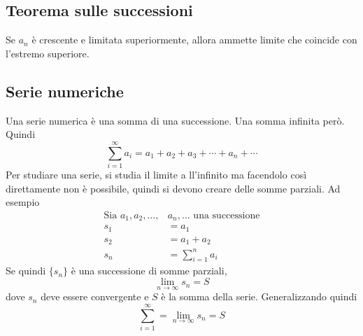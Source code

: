 \subsection{Teorema sulle successioni}
\begin{successioniMonotone}
  Se $a_n$ è crescente e limitata superiormente, allora ammette limite che coincide con l'estremo
  superiore.
\end{successioniMonotone}

\subsection{Serie numeriche}
Una serie numerica è una somma di una successione. Una somma infinita però. Quindi
\begin{equation*}
  \sum\limits^{\infty}_{i=1} a_i = a_1+a_2+a_3+\dotsb+a_n+\dotsb
\end{equation*}
Per studiare una serie, si studia il limite a ll'infinito ma facendolo così direttamente non è
possibile, quindi si devono creare delle somme parziali. Ad esempio
\begin{align*}
  \text{Sia }a_1,a_2,\ldots,&a_n,\ldots\text{ una successione}\\
  s_1 &= a_1\\
  s_2 &= a_1+a_2\\
  s_n &= \sum\limits^{n}_{i=1} a_i
\end{align*}
Se quindi $\{s_n\}$ è una successione di somme parziali,
\begin{equation*}
  \lim\limits_{n \to \infty} s_n = S
\end{equation*}
dove $s_n$ deve essere convergente e $S$ è la somma della serie. Generalizzando quindi
\begin{equation*}
  \sum\limits^{\infty}_{i=1} = \lim\limits_{n \to \infty} s_n = S
\end{equation*}

